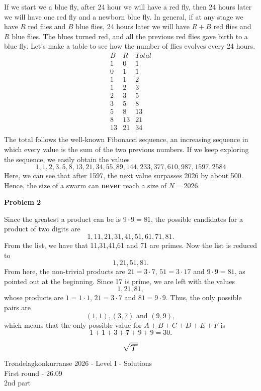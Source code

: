 \documentclass[a4paper,12pt]{article}
\begin{document}
If we start we a blue fly, after 24 hour we will have a red fly, then 24 hours later we will have one red fly and a newborn blue fly. In general, if at any stage we have $R$ red flies and $B$ blue flies, 24 hours later we will have $R+B$ red flies and $R$ blue flies. The blues turned red, and all the previous red flies gave birth to a blue fly. Let's make a table to see how the number of flies evolves every 24 hours.
$$\begin{array}{c|c|c}
	B & R & Total  \\\hline
	1 & 0 & 1 \\
	0 & 1 & 1 \\
	1 & 1 & 2 \\
	1 & 2 & 3 \\
	2 & 3 & 5 \\
	3 & 5 & 8 \\
	5 & 8 & 13 \\
	8 & 13 & 21 \\
	13 & 21 & 34 \\
\end{array}$$
The total follows the well-known Fibonacci sequence, an increasing sequence in which every value is the sum of the two previous numbers. If we keep exploring the sequence, we easily obtain the values
$$1,1,2,3,5,8,13,21,34,55,89,144,233,377,610,987,1597,2584$$
Here, we can see that after 1597, the next value surpasses 2026 by about 500. Hence, the size of a swarm can {\bf never} reach a size of $N=2026$.

\vspace{.6cm}
{\bf Problem 2}

Since the greatest a product can be is $9\cdot9=81$, the possible candidates for a product of two digits are
$$1,11,21,31,41,51,61,71,81.$$
From the list, we have that 11,31,41,61 and 71 are primes. Now the list is reduced to 
$$1,21,51,81.$$
From here, the non-trivial products are $21=3\cdot7$, $51=3\cdot17$ and $9\cdot9=81$, as pointed out at the beginning. Since 17 is prime, we are left with the values
$$1,21,81,$$
whose products are $1=1\cdot1$, $21=3\cdot7$ and $81=9\cdot9$. Thus, the only possible pairs are
$$(1,1),(3,7)\text{ and }(9,9),$$
which means that the only possible value for $A+B+C+D+E+F$ is
$$1+1+3+7+9+9=30.$$

\newpage %


\begin{center}
	\huge $$\sqrt{\scalebox{2.1}{$\tau$}}$$
	\Large Trøndelagkonkurranse 2026 - Level I - Solutions\\[2pt] First round - 26.09\\
	2nd part
\end{center}
\vspace{1cm}
\end{document}
